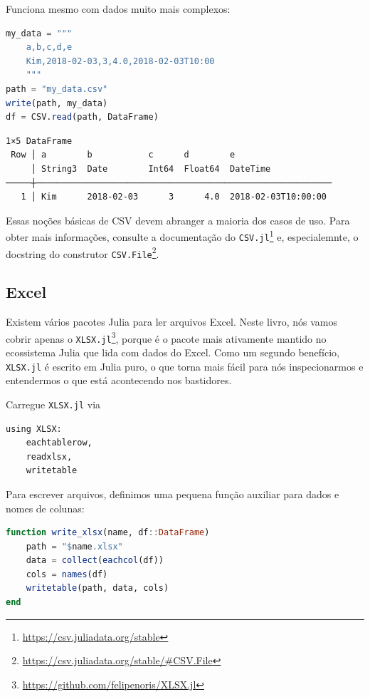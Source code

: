 \documentclass[
  notoc %
]{tufte-book}
\DeclareRobustCommand{\href}[2]{#2\footnote{\url{#1}}}
\newcommand{\passthrough}[1]{#1}
\begin{document}
Funciona mesmo com dados muito mais complexos:

\begin{lstlisting}[language=Julia]
my_data = """
    a,b,c,d,e
    Kim,2018-02-03,3,4.0,2018-02-03T10:00
    """
path = "my_data.csv"
write(path, my_data)
df = CSV.read(path, DataFrame)
\end{lstlisting}

\begin{lstlisting}[language=Output]
1×5 DataFrame
 Row │ a        b           c      d        e
     │ String3  Date        Int64  Float64  DateTime
─────┼──────────────────────────────────────────────────────────
   1 │ Kim      2018-02-03      3      4.0  2018-02-03T10:00:00
\end{lstlisting}

Essas noções básicas de CSV devem abranger a maioria dos casos de uso.
Para obter mais informações, consulte a
\href{https://csv.juliadata.org/stable}{documentação do
\passthrough{\lstinline!CSV.jl!}} e, especialemnte, o
\href{https://csv.juliadata.org/stable/\#CSV.File}{docstring do
construtor \passthrough{\lstinline!CSV.File!}}.

\hypertarget{sec:excel}{%
\subsection{Excel}\label{sec:excel}}

Existem vários pacotes Julia para ler arquivos Excel. Neste livro, nós
vamos cobrir apenas o
\href{https://github.com/felipenoris/XLSX.jl}{\passthrough{\lstinline!XLSX.jl!}},
porque é o pacote mais ativamente mantido no ecossistema Julia que lida
com dados do Excel. Como um segundo benefício,
\passthrough{\lstinline!XLSX.jl!} é escrito em Julia puro, o que torna
mais fácil para nós inspecionarmos e entendermos o que está acontecendo
nos bastidores.

Carregue \passthrough{\lstinline!XLSX.jl!} via

\begin{lstlisting}
using XLSX:
    eachtablerow,
    readxlsx,
    writetable
\end{lstlisting}

Para escrever arquivos, definimos uma pequena função auxiliar para dados
e nomes de colunas:

\begin{lstlisting}[language=Julia]
function write_xlsx(name, df::DataFrame)
    path = "$name.xlsx"
    data = collect(eachcol(df))
    cols = names(df)
    writetable(path, data, cols)
end
\end{lstlisting}
\end{document}
